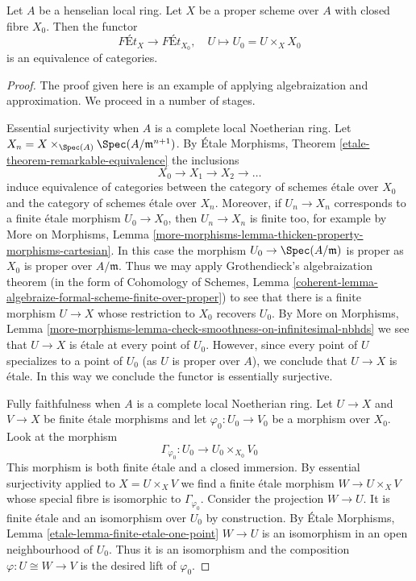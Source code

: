 \begin{lemma}
\label{lemma-finite-etale-on-proper-over-henselian}
Let $A$ be a henselian local ring. Let $X$ be a proper scheme over $A$
with closed fibre $X_0$. Then the functor
$$
\textit{F\'Et}_X \to \textit{F\'Et}_{X_0},\quad
U \longmapsto U_0 = U \times_X X_0
$$
is an equivalence of categories.
\end{lemma}

\begin{proof}
The proof given here is an example of applying algebraization and
approximation. We proceed in a number of stages.

\medskip\noindent
Essential surjectivity when $A$ is a complete local Noetherian ring.
Let $X_n = X \times_{\Spec(A)} \Spec(A/\mathfrak m^{n + 1})$.
By \'Etale Morphisms, Theorem \ref{etale-theorem-remarkable-equivalence}
the inclusions
$$
X_0 \to X_1 \to X_2 \to \ldots
$$
induce equivalence of categories between the category
of schemes \'etale over $X_0$ and the category of schemes
\'etale over $X_n$.
Moreover, if $U_n \to X_n$ corresponds to a finite \'etale
morphism $U_0 \to X_0$, then $U_n \to X_n$ is finite too, for example
by More on Morphisms, Lemma
\ref{more-morphisms-lemma-thicken-property-morphisms-cartesian}.
In this case the morphism $U_0 \to \Spec(A/\mathfrak m)$
is proper as $X_0$ is proper over $A/\mathfrak m$. Thus we may apply
Grothendieck's algebraization theorem
(in the form of
Cohomology of Schemes, Lemma
\ref{coherent-lemma-algebraize-formal-scheme-finite-over-proper})
to see that there is a finite morphism $U \to X$ whose restriction
to $X_0$ recovers $U_0$. By More on Morphisms, Lemma
\ref{more-morphisms-lemma-check-smoothness-on-infinitesimal-nbhds}
we see that $U \to X$ is \'etale at every point of $U_0$.
However, since every point of $U$ specializes to a point of $U_0$
(as $U$ is proper over $A$), we conclude that $U \to X$ is \'etale.
In this way we conclude the functor is essentially surjective.

\medskip\noindent
Fully faithfulness when $A$ is a complete local Noetherian ring.
Let $U \to X$ and $V \to X$ be finite \'etale morphisms and
let $\varphi_0 : U_0 \to V_0$ be a morphism over $X_0$. Look at
the morphism
$$
\Gamma_{\varphi_0} : U_0 \longrightarrow U_0 \times_{X_0} V_0
$$
This morphism is both finite \'etale and a closed immersion.
By essential surjectivity applied to $X = U \times_X V$ we find
a finite \'etale morphism $W \to U \times_X V$ whose special
fibre is isomorphic to $\Gamma_{\varphi_0}$. Consider the projection
$W \to U$. It is finite \'etale and an isomorphism over $U_0$ by
construction. By \'Etale Morphisms, Lemma
\ref{etale-lemma-finite-etale-one-point}
$W \to U$ is an isomorphism in an open neighbourhood of $U_0$.
Thus it is an isomorphism and the composition $\varphi : U \cong W \to V$
is the desired lift of $\varphi_0$.


\end{proof}
